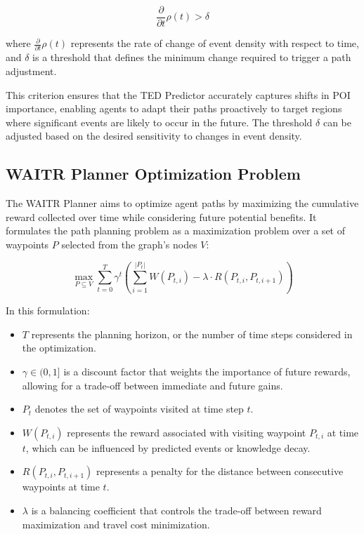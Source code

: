 \documentclass[conference]{IEEEtran}
\begin{document}
\[
\frac{\partial}{\partial t} \rho(t) > \delta
\]

where \(\frac{\partial}{\partial t} \rho(t)\) represents the rate of change of event density with respect to time, and \(\delta\) is a threshold that defines the minimum change required to trigger a path adjustment.

This criterion ensures that the TED Predictor accurately captures shifts in POI importance, enabling agents to adapt their paths proactively to target regions where significant events are likely to occur in the future. The threshold \(\delta\) can be adjusted based on the desired sensitivity to changes in event density.

\subsection{WAITR Planner Optimization Problem}

The WAITR Planner aims to optimize agent paths by maximizing the cumulative reward collected over time while considering future potential benefits. It formulates the path planning problem as a maximization problem over a set of waypoints \(P\) selected from the graph's nodes \(V\):

\[
\max_{P \subseteq V} \sum_{t=0}^{T} \gamma^t  \left( \sum_{i=1}^{|P_t|} W(P_{t,i}) - \lambda \cdot R(P_{t,i}, P_{t,i+1}) \right)
\]

In this formulation:

\begin{itemize}
    \item \(T\) represents the planning horizon, or the number of time steps considered in the optimization.
    \item \( \gamma \in (0, 1] \) is a discount factor that weights the importance of future rewards, allowing for a trade-off between immediate and future gains.
    \item \(P_t\) denotes the set of waypoints visited at time step \(t\).
    \item \(W(P_{t,i})\) represents the reward associated with visiting waypoint \(P_{t,i}\) at time \(t\), which can be influenced by predicted events or knowledge decay.
    \item \(R(P_{t,i}, P_{t,i+1})\) represents a penalty for the distance between consecutive waypoints at time \(t\).
    \item \(\lambda\) is a balancing coefficient that controls the trade-off between reward maximization and travel cost minimization.
\end{itemize}
\end{document}
